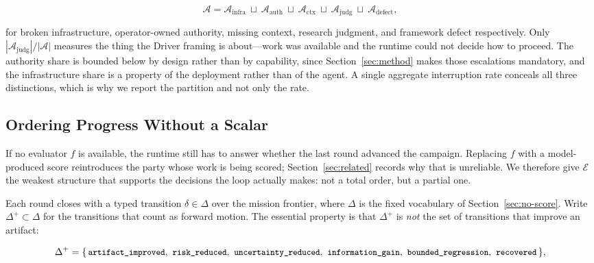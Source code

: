 \begin{equation}
  \mathcal{A}=\mathcal{A}_{\mathrm{infra}}\ \sqcup\
  \mathcal{A}_{\mathrm{auth}}\ \sqcup\
  \mathcal{A}_{\mathrm{ctx}}\ \sqcup\
  \mathcal{A}_{\mathrm{judg}}\ \sqcup\
  \mathcal{A}_{\mathrm{defect}},
  \label{eq:interruption-partition}
\end{equation}

for broken infrastructure, operator-owned authority, missing context, research
judgment, and framework defect respectively. Only
$|\mathcal{A}_{\mathrm{judg}}|/|\mathcal{A}|$ measures the thing the Driver framing
is about---work was available and the runtime could not decide how to proceed. The
authority share is bounded below by design rather than by capability, since
Section~\ref{sec:method} makes those escalations mandatory, and the infrastructure
share is a property of the deployment rather than of the agent. A single aggregate
interruption rate conceals all three distinctions, which is why we report the
partition and not only the rate.

\subsection{Ordering Progress Without a Scalar}
\label{sec:evidence-order}

If no evaluator $f$ is available, the runtime still has to answer whether the last
round advanced the campaign. Replacing $f$ with a model-produced score reintroduces
the party whose work is being scored; Section~\ref{sec:related} records why that is
unreliable. We therefore give $\mathcal{E}$ the weakest structure that supports the
decisions the loop actually makes: not a total order, but a partial one.

Each round closes with a typed transition $\delta\in\Delta$ over the mission
frontier, where $\Delta$ is the fixed vocabulary of
Section~\ref{sec:no-score}. Write $\Delta^{+}\subset\Delta$ for the transitions that
count as forward motion. The essential property is that $\Delta^{+}$ is
\emph{not} the set of transitions that improve an artifact:

\begin{equation}
  \Delta^{+}=\{\,\code{artifact\_improved},\ \code{risk\_reduced},\
  \code{uncertainty\_reduced},\ \code{information\_gain},\
  \code{bounded\_regression},\ \code{recovered}\,\},
  \label{eq:progress-set}
\end{equation}

